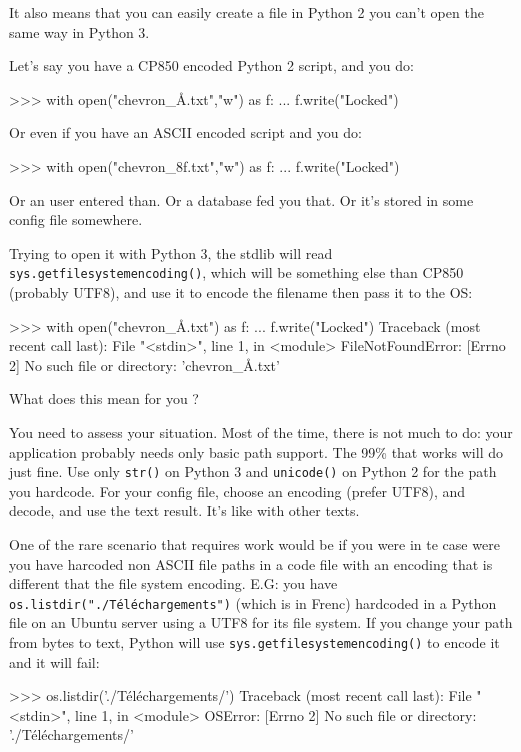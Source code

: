 It also means that you can easily create a file in Python 2 you can't open the same way in Python 3.

Let's say you have a CP850 encoded Python 2 script, and you do:

\begin{py2}
>>> with open("chevron_Å.txt","w") as f:
...    f.write("Locked")
\begin{py2}

Or even if you have an ASCII encoded script and you do:

\begin{py2}
>>> with open("chevron_\x8f.txt","w") as f:
...    f.write("Locked")
\begin{py2}

Or an user entered than. Or a database fed you that. Or it's stored in some config file somewhere.

Trying to open it with Python 3, the stdlib will read \lstinline{sys.getfilesystemencoding()}, which will be something else than CP850 (probably UTF8), and use it to encode the filename then pass it to the OS:

\begin{py2}
>>> with open("chevron_Å.txt") as f:
...    f.write("Locked")
Traceback (most recent call last):
  File "<stdin>", line 1, in <module>
FileNotFoundError: [Errno 2] No such file or directory: 'chevron_Å.txt'
\end{py2}

What does this mean for you ?

You need to assess your situation. Most of the time, there is not much to do: your application probably needs only basic path support. The 99\% that works will do just fine. Use only \lstinline{str()} on Python 3 and \lstinline{unicode()} on Python 2 for the path you hardcode. For your config file, choose an encoding (prefer UTF8), and decode, and use the text result. It's like with other texts.

One of the rare scenario that requires work would be if you were in te case were you have harcoded non ASCII file paths in a code file with an encoding that is different that the file system encoding. E.G: you have \lstinline{os.listdir("./Téléchargements")} (which is  in Frenc) hardcoded in a  Python file on an Ubuntu server using a UTF8 for its file system. If you change your path from bytes to text, Python will use \lstinline{sys.getfilesystemencoding()} to encode it and it will fail:

\begin{py2}
>>> os.listdir('./Téléchargements/')
Traceback (most recent call last):
    File "<stdin>", line 1, in <module>
OSError: [Errno 2] No such file or directory: './Téléchargements/'
\end{py2}


\end{py2}
\end{py2}
\end{py2}
\end{py2}
